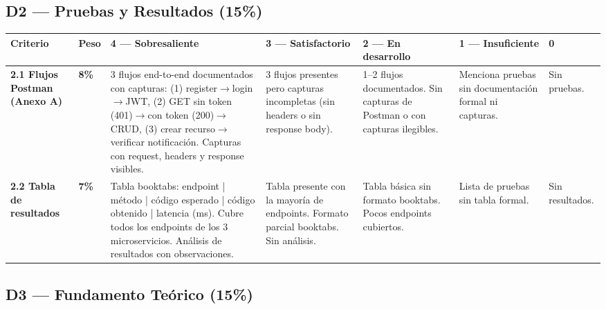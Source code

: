 \documentclass[11pt,a4paper,landscape]{article}
\begin{document}
	\vspace{6pt}
	
	\subsection{D2 --- Pruebas y Resultados (15\%)}
	
	\begin{center}
		\footnotesize
		\begin{tabular}{|P{2.2cm}|C{1cm}|L{8.2cm}|L{3.8cm}|L{3.8cm}|L{3cm}|L{2cm}|}
			\hline
			\color{white}\textbf{Criterio} & \color{white}\textbf{Peso} &
			\color{white}\textbf{4 --- Sobresaliente} &
			\color{white}\textbf{3 --- Satisfactorio} &
			\color{white}\textbf{2 --- En desarrollo} &
			\color{white}\textbf{1 --- Insuficiente} &
			\color{white}\textbf{0}\\
			\hline
			
			\textbf{2.1 Flujos Postman (Anexo A)} &
			\textbf{8\%} &
			3 flujos end-to-end documentados con capturas: (1) register$\to$login$\to$JWT, (2) GET sin token (401)$\to$con token (200)$\to$CRUD, (3) crear recurso$\to$verificar notificaci\'on. Capturas con request, headers y response visibles. &
			3 flujos presentes pero capturas incompletas (sin headers o sin response body). &
			1--2 flujos documentados. Sin capturas de Postman o con capturas ilegibles. &
			Menciona pruebas sin documentaci\'on formal ni capturas. &
			Sin pruebas.\\
			\hline
			
			\textbf{2.2 Tabla de resultados} &
			\textbf{7\%} &
			Tabla booktabs: endpoint | m\'etodo | c\'odigo esperado | c\'odigo obtenido | latencia (ms). Cubre todos los endpoints de los 3 microservicios. An\'alisis de resultados con observaciones. &
			Tabla presente con la mayor\'ia de endpoints. Formato parcial booktabs. Sin an\'alisis. &
			Tabla b\'asica sin formato booktabs. Pocos endpoints cubiertos. &
			Lista de pruebas sin tabla formal. &
			Sin resultados.\\
			\hline
		\end{tabular}
	\end{center}
	
	\vspace{6pt}
	
	\subsection{D3 --- Fundamento Te\'orico (15\%)}
	
\end{document}
